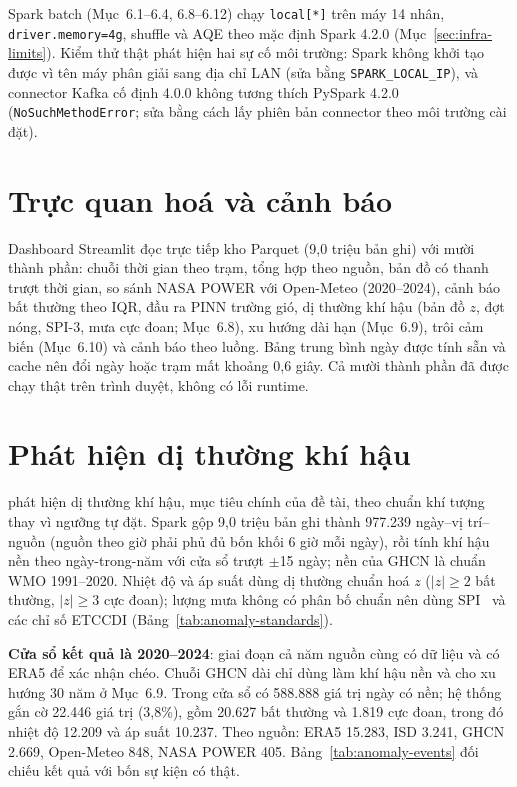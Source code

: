 \documentclass[12pt,a4paper]{report}
\begin{document}
\begin{sloppypar}
Spark batch (Mục~6.1--6.4, 6.8--6.12) chạy \texttt{local[*]} trên máy 14 nhân,
\texttt{driver.memory=4g}, shuffle và AQE theo mặc định Spark 4.2.0 (Mục~\ref{sec:infra-limits}).
Kiểm thử thật phát hiện hai sự cố môi trường: Spark không khởi tạo được vì tên máy phân giải sang địa
chỉ LAN (sửa bằng \texttt{SPARK\_LOCAL\_IP}), và connector Kafka cố định 4.0.0 không tương thích PySpark
4.2.0 (\texttt{NoSuchMethodError}; sửa bằng cách lấy phiên bản connector theo môi trường cài đặt).
\end{sloppypar}

\section{Trực quan hoá và cảnh báo}

Dashboard Streamlit đọc trực tiếp kho Parquet (9,0 triệu bản ghi) với mười thành phần: chuỗi thời gian
theo trạm, tổng hợp theo nguồn, bản đồ có thanh trượt thời gian, so sánh NASA POWER với Open-Meteo
(2020--2024), cảnh báo bất thường theo IQR, đầu ra PINN trường gió, dị thường khí hậu (bản đồ $z$, đợt
nóng, SPI-3, mưa cực đoan; Mục~6.8), xu hướng dài hạn (Mục~6.9), trôi cảm biến (Mục~6.10) và cảnh báo
theo luồng. Bảng trung bình ngày được tính sẵn và cache nên đổi ngày hoặc trạm mất khoảng 0,6 giây. Cả
mười thành phần đã được chạy thật trên trình duyệt, không có lỗi runtime.

\section{Phát hiện dị thường khí hậu}

 phát hiện dị thường khí hậu, mục tiêu chính của đề tài, theo chuẩn
khí tượng thay vì ngưỡng tự đặt. Spark gộp 9,0 triệu bản ghi thành 977.239 ngày--vị trí--nguồn
(nguồn theo giờ phải phủ đủ bốn khối 6 giờ mỗi ngày), rồi tính khí hậu nền theo ngày-trong-năm với cửa sổ
trượt $\pm$15 ngày; nền của GHCN là chuẩn WMO 1991--2020. Nhiệt độ và áp suất dùng dị thường chuẩn hoá
$z$ ($|z|\ge2$ bất thường, $|z|\ge3$ cực đoan); lượng mưa không có phân bố chuẩn nên dùng SPI~\cite{mckee1993spi}
và các chỉ số ETCCDI (Bảng~\ref{tab:anomaly-standards}).

\textbf{Cửa sổ kết quả là 2020--2024}: giai đoạn cả năm nguồn cùng có dữ liệu và có ERA5 để xác nhận chéo.
Chuỗi GHCN dài chỉ dùng làm khí hậu nền và cho xu hướng 30 năm ở Mục~6.9. Trong cửa sổ có 588.888 giá trị
ngày có nền; hệ thống gắn cờ 22.446 giá trị (3,8\%), gồm 20.627 bất thường và 1.819 cực đoan, trong đó
nhiệt độ 12.209 và áp suất 10.237. Theo nguồn: ERA5 15.283, ISD 3.241, GHCN 2.669, Open-Meteo 848, NASA
POWER 405. Bảng~\ref{tab:anomaly-events} đối chiếu kết quả với bốn sự kiện có thật.
\end{document}
